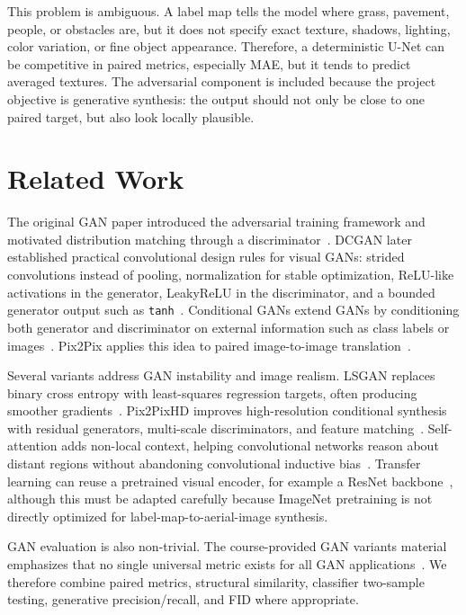 \documentclass[conference]{IEEEtran}
\newcommand{\code}[1]{\texttt{#1}}
\begin{document}
This problem is ambiguous. A label map tells the model where grass, pavement, people, or obstacles are, but it does not specify exact texture, shadows, lighting, color variation, or fine object appearance. Therefore, a deterministic U-Net can be competitive in paired metrics, especially MAE, but it tends to predict averaged textures. The adversarial component is included because the project objective is generative synthesis: the output should not only be close to one paired target, but also look locally plausible.

\section{Related Work}
The original GAN paper introduced the adversarial training framework and motivated distribution matching through a discriminator~\cite{goodfellow2014gan}. DCGAN later established practical convolutional design rules for visual GANs: strided convolutions instead of pooling, normalization for stable optimization, ReLU-like activations in the generator, LeakyReLU in the discriminator, and a bounded generator output such as \code{tanh}~\cite{radford2016dcgan}. Conditional GANs extend GANs by conditioning both generator and discriminator on external information such as class labels or images~\cite{mirza2014cgan}. Pix2Pix applies this idea to paired image-to-image translation~\cite{isola2017pix2pix}.

Several variants address GAN instability and image realism. LSGAN replaces binary cross entropy with least-squares regression targets, often producing smoother gradients~\cite{mao2017lsgan}. Pix2PixHD improves high-resolution conditional synthesis with residual generators, multi-scale discriminators, and feature matching~\cite{wang2018pix2pixhd}. Self-attention adds non-local context, helping convolutional networks reason about distant regions without abandoning convolutional inductive bias~\cite{zhang2019sagan}. Transfer learning can reuse a pretrained visual encoder, for example a ResNet backbone~\cite{he2016resnet}, although this must be adapted carefully because ImageNet pretraining is not directly optimized for label-map-to-aerial-image synthesis.

GAN evaluation is also non-trivial. The course-provided GAN variants material emphasizes that no single universal metric exists for all GAN applications~\cite{ganvariants}. We therefore combine paired metrics, structural similarity, classifier two-sample testing, generative precision/recall, and FID where appropriate.
\end{document}
